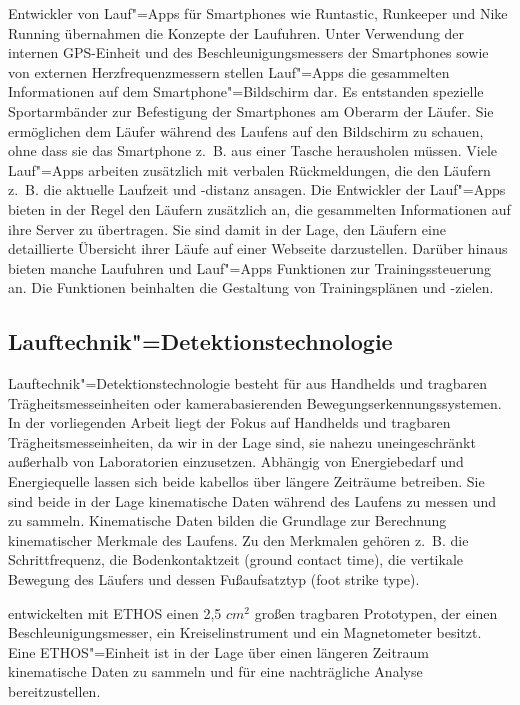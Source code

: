 Entwickler von Lauf"=Apps für Smartphones wie Runtastic, Runkeeper und Nike Running übernahmen die Konzepte der Laufuhren. Unter Verwendung der internen \acs{GPS}-Einheit und des Beschleunigungsmessers der Smartphones sowie von externen Herzfrequenzmessern stellen Lauf"=Apps die gesammelten Informationen auf dem Smartphone"=Bildschirm dar. Es entstanden spezielle Sportarmbänder zur Befestigung der Smartphones am Oberarm der Läufer. Sie ermöglichen dem Läufer während des Laufens auf den Bildschirm zu schauen, ohne dass sie das Smartphone z.~B. aus einer Tasche herausholen müssen. Viele Lauf"=Apps arbeiten zusätzlich mit verbalen Rückmeldungen, die den Läufern z.~B. die aktuelle Laufzeit und -distanz ansagen. Die Entwickler der Lauf"=Apps bieten in der Regel den Läufern zusätzlich an, die gesammelten Informationen auf ihre Server zu übertragen. Sie sind damit in der Lage, den Läufern eine detaillierte Übersicht ihrer Läufe auf einer Webseite darzustellen. Darüber hinaus bieten manche Laufuhren und Lauf"=Apps Funktionen zur Trainingssteuerung an. Die Funktionen beinhalten die Gestaltung von Trainingsplänen und -zielen.

\subsection{Lauftechnik"=Detektionstechnologie} 

\label{sub:lauftechnik_detektionstechnologie}

Lauftechnik"=Detektionstechnologie besteht für \citet{Jensen2014} aus Handhelds und tragbaren Trägheitsmesseinheiten oder kamerabasierenden Bewegungserkennungssystemen. In der vorliegenden Arbeit liegt der Fokus auf Handhelds und tragbaren Trägheitsmesseinheiten, da wir in der Lage sind, sie nahezu uneingeschränkt außerhalb von Laboratorien einzusetzen. Abhängig von Energiebedarf und Energiequelle lassen sich beide kabellos über längere Zeiträume betreiben. Sie sind beide in der Lage kinematische Daten während des Laufens zu messen und zu sammeln. Kinematische Daten bilden die Grundlage zur Berechnung kinematischer Merkmale des Laufens. Zu den Merkmalen gehören z.~B. die Schrittfrequenz, die Bodenkontaktzeit (ground contact time), die vertikale Bewegung des Läufers und dessen Fußaufsatztyp (foot strike type).

\citet{Harms2010} entwickelten mit ETHOS einen 2,5 $cm^{2}$ großen tragbaren Prototypen, der einen Beschleunigungsmesser, ein Kreiselinstrument und ein Magnetometer besitzt. Eine ETHOS"=Einheit ist in der Lage über einen längeren Zeitraum kinematische Daten zu sammeln und für eine nachträgliche Analyse bereitzustellen.


